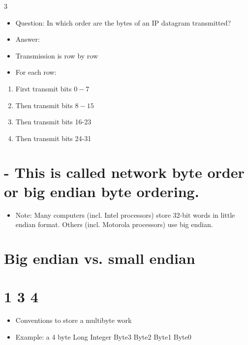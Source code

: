 \documentclass[10pt]{article}
\begin{document}
3

\begin{itemize}
  \item Question: In which order are the bytes of an IP datagram transmitted?

  \item Answer:

  \item Transmission is row by row

  \item For each row:

\end{itemize}

\begin{enumerate}
  \item First transmit bits $0-7$

  \item Then transmit bits $8-15$

  \item Then transmit bits 16-23

  \item Then transmit bits 24-31

\end{enumerate}

\section{- This is called network byte order or big endian byte ordering.}
\begin{itemize}
  \item Note: Many computers (incl. Intel processors) store 32-bit words in little endian format. Others (incl. Motorola processors) use big endian.
\end{itemize}

\section{Big endian vs. small endian}
\section{1 
 3 
 4}
\begin{itemize}
  \item Conventions to store a multibyte work

  \item Example: a 4 byte Long Integer Byte3 Byte2 Byte1 Byte0

\end{itemize}
\end{document}
